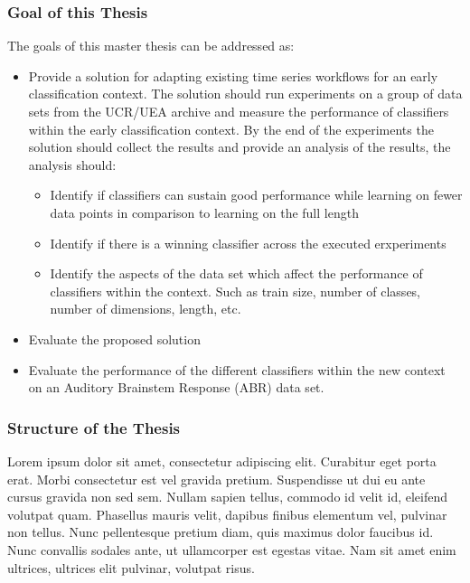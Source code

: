 \subsubsection*{Goal of this Thesis}
\label{thesisGoals}
The goals of this master thesis can be addressed as:

\begin{itemize}
    \item Provide a solution for adapting existing time series workflows for an early classification context. The solution should run experiments on a group of data sets from the UCR/UEA archive and measure the performance of classifiers within the early classification context. By the end of the experiments the solution should collect the results and provide an analysis of the results, the analysis should:
    \begin{itemize}
        \item Identify if classifiers can sustain good performance while learning on fewer data points in comparison to learning on the full length
        \item Identify if there is a winning classifier across the executed erxperiments
        \item Identify the aspects of the data set which affect the performance of classifiers within the context. Such as train size, number of classes, number of dimensions, length, etc.
    \end{itemize}
    \item Evaluate the proposed solution
    \item Evaluate the performance of the different classifiers within the new context on an Auditory Brainstem Response (ABR) data set.
\end{itemize}

\subsubsection*{Structure of the Thesis}
\label{thesisStructure}
Lorem ipsum dolor sit amet, consectetur adipiscing elit. Curabitur eget porta erat. Morbi consectetur est vel gravida pretium. Suspendisse ut dui eu ante cursus gravida non sed sem. Nullam sapien tellus, commodo id velit id, eleifend volutpat quam. Phasellus mauris velit, dapibus finibus elementum vel, pulvinar non tellus. Nunc pellentesque pretium diam, quis maximus dolor faucibus id. Nunc convallis sodales ante, ut ullamcorper est egestas vitae. Nam sit amet enim ultrices, ultrices elit pulvinar, volutpat risus.